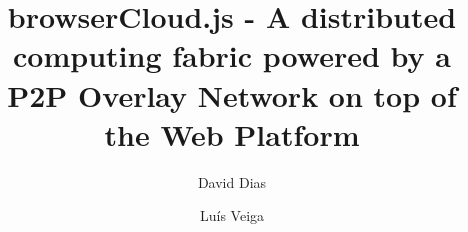 \documentclass[sigplan]{acmart}
\begin{document}
\title{browserCloud.js - A distributed computing fabric powered by a P2P Overlay Network on top of the Web Platform}


\renewcommand{\shorttitle}{browserCloud.js}


\author{David Dias}

\author{Lu\'is Veiga}


\maketitle










\end{document}
